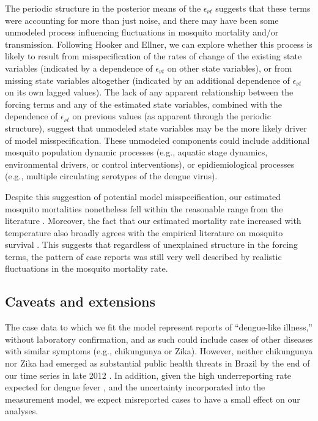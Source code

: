 \documentclass[10pt,letterpaper]{article}
\begin{document}
The periodic structure in the posterior means of the $\epsilon_{\nu t}$ suggests that these terms were accounting for more than just noise, and there may have been some unmodeled process influencing fluctuations in mosquito mortality and/or transmission.
Following Hooker and Ellner, we can explore whether this process is likely to result from misspecification of the rates of change of the existing state variables (indicated by a dependence of $\epsilon_{\nu t}$ on other state variables), or from missing state variables altogether (indicated by an additional dependence of $\epsilon_{\nu t}$ on its own lagged values). 
The lack of any apparent relationship between the forcing terms and any of the estimated state variables, combined with the dependence of $\epsilon_{\nu t}$ on previous values (as apparent through the periodic structure), suggest that unmodeled state variables may be the more likely driver of model misspecification.
These unmodeled components could include additional mosquito population dynamic processes (e.g., aquatic stage dynamics, environmental drivers, or control interventions), or epidiemiological processes (e.g., multiple circulating serotypes of the dengue virus).

Despite this suggestion of potential model misspecification, our estimated mosquito mortalities nonetheless fell within the reasonable range from the literature \cite{Maciel-de-Freitas2008, Brady2013}.
Moreover, the fact that our estimated mortality rate increased with temperature also broadly agrees with the empirical literature on mosquito survival \cite{Yang2009, Brady2013}.
This suggests that regardless of unexplained structure in the forcing terms, the pattern of case reports was still very well described by realistic fluctuations in the mosquito mortality rate.

\subsection*{Caveats and extensions}

The case data to which we fit the model represent reports of ``dengue-like illness,'' without laboratory confirmation, and as such could include cases of other diseases with similar symptoms (e.g., chikungunya or Zika).
However, neither chikungunya nor Zika had emerged as substantial public health threats in Brazil by the end of our time series in late 2012 \cite{PAHO2014, PAHO2015}.
In addition, given the high underreporting rate expected for dengue fever \cite{Silva2016}, and the uncertainty incorporated into the measurement model, we expect misreported cases to have a small effect on our analyses.
\end{document}

